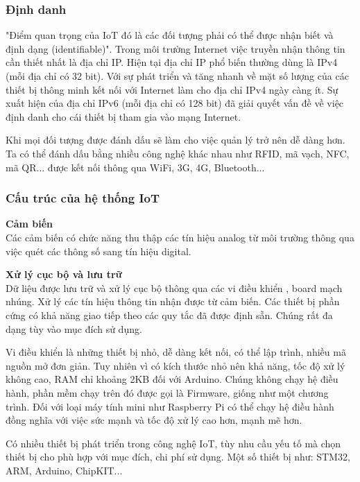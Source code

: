 \documentclass[a4paper,12pt,oneside]{article}
\begin{document}
\subsubsection{Định danh}

\noindent "Điểm quan trọng của IoT đó là các đối tượng phải có thể được nhận biết và định dạng (identifiable)"\cite{iot}. Trong môi trường Internet việc truyền nhận thông tin cần thiết nhất là địa chỉ IP. Hiện tại địa chỉ IP phổ biến thường dùng là IPv4 (mỗi địa chỉ có 32 bit). Với sự phát triển và tăng nhanh về mặt số lượng của các thiết bị thông minh kết nối với Internet làm cho địa chỉ IPv4 ngày càng ít. Sự xuất hiện của địa chỉ IPv6 (mỗi địa chỉ có 128 bit) đã giải quyết vấn đề về việc định danh cho cái thiết bị tham gia vào mạng Internet. 

\noindent Khi mọi đối tượng được đánh dấu sẽ làm cho việc quản lý trở nên dễ dàng hơn. Ta có thể đánh dấu bằng nhiều công nghệ khác nhau như RFID, mã vạch, NFC, mã QR... được kết nối thông qua WiFi, 3G, 4G, Bluetooth...

\subsubsection{Cấu trúc của hệ thống IoT\cite{cautruciot}}

\noindent \textbf{Cảm biến}\\
\noindent Các cảm biến có chức năng thu thập các tín hiệu analog từ môi trường thông qua việc quét các thông số sang tín hiệu digital.

\noindent \textbf{Xử lý cục bộ và lưu trữ}\\
\noindent Dữ liệu được lưu trữ và xử lý cục bộ thông qua các vi điều khiển , board mạch nhúng. Xử lý các tín hiệu thông tin nhận được từ cảm biến. Các thiết bị phần cứng có khả năng giao tiếp theo các quy tắc đã được định sẵn. Chúng rất đa dạng tùy vào mục đích sử dụng.

\noindent Vi điều khiển là những thiết bị nhỏ, dễ dàng kết nối, có thể lập trình, nhiều mã nguồn mở đơn giản. Tuy nhiên vì có kích thước nhỏ nên khả năng, tốc độ xử lý không cao, RAM chỉ khoảng 2KB đối với Arduino. Chúng không chạy hệ điều hành, phần mềm chạy trên đó được gọi là Firmware, giống như một chương trình. Đối với loại máy tính mini như Raspberry Pi có thể chạy hệ điều hành đồng nghĩa với việc sức mạnh và tốc độ xử lý cao hơn, mạnh mẽ hơn.

\noindent Có nhiều thiết bị phát triển trong công nghệ IoT, tùy nhu cầu yếu tố mà chọn thiết bị cho phù hợp với mục đích, chi phí sử dụng. Một số thiết bị như: 	STM32, ARM, Arduino, ChipKIT...
\end{document}

